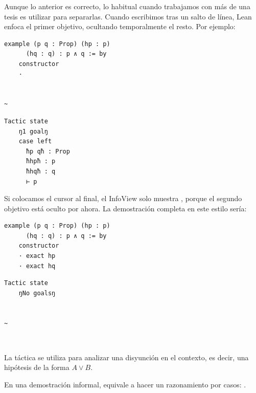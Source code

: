 Aunque lo anterior es correcto, lo habitual cuando trabajamos con más de una tesis es utilizar  para separarlas. Cuando escribimos  tras un salto de línea, Lean enfoca el primer objetivo, ocultando temporalmente el resto. Por ejemplo:

\begin{minipage}[t]{0.58\textwidth}
\begin{lstlisting}[language=lean]
  example (p q : Prop) (hp : p)
      (hq : q) : p ∧ q := by
    constructor
    ·


~
\end{lstlisting}
\end{minipage}%
\hfill
\begin{minipage}[t]{0.40\textwidth}
\begin{lstlisting}[language=infoview]
  Tactic state
    ŋ1 goalŋ
    case left
      ħp qħ : Prop
      ħhpħ : p
      ħhqħ : q
      ⊢ p
\end{lstlisting}
\end{minipage}

Si colocamos el cursor al final, el InfoView solo muestra , porque el segundo objetivo está oculto por ahora. La demostración completa en este estilo sería:


\begin{minipage}[t]{0.58\textwidth}
\begin{lstlisting}[language=lean]
  example (p q : Prop) (hp : p)
      (hq : q) : p ∧ q := by
    constructor
    · exact hp
    · exact hq
\end{lstlisting}
\end{minipage}%
\hfill
\begin{minipage}[t]{0.40\textwidth}
\begin{lstlisting}[language=infoview]
  Tactic state
    ŋNo goalsŋ


~
\end{lstlisting}
\end{minipage}


\vspace{1em}
\noindent\textbf{$~$ }

La táctica  se utiliza para analizar una disyunción en el contexto, es decir, una hipótesis de la forma $A \lor B$.

En una demostración informal, equivale a hacer un razonamiento por casos: .

